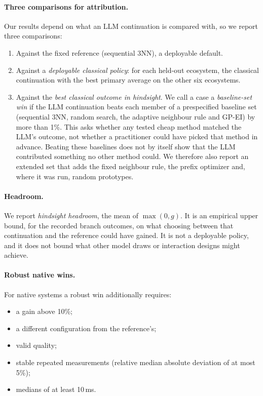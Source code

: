 \paragraph{Three comparisons for attribution.} Our results depend on what an LLM continuation is compared with, so we report three comparisons:
\begin{enumerate}
  \item Against the fixed reference (sequential 3NN), a deployable default.
  \item Against a \emph{deployable classical policy}: for each held-out ecosystem, the classical continuation with the best primary average on the other six ecosystems.
  \item Against the \emph{best classical outcome in hindsight}. We call a case a \emph{baseline-set win} if the LLM continuation beats each member of a prespecified baseline set (sequential 3NN, random search, the adaptive neighbour rule and GP-EI) by more than 1\%. This asks whether any tested cheap method matched the LLM's outcome, not whether a practitioner could have picked that method in advance. Beating these baselines does not by itself show that the LLM contributed something no other method could. We therefore also report an extended set that adds the fixed neighbour rule, the prefix optimizer and, where it was run, random prototypes.
\end{enumerate}

\paragraph{Headroom.} We report \emph{hindsight headroom}, the mean of $\max(0, g)$. It is an empirical upper bound, for the recorded branch outcomes, on what choosing between that continuation and the reference could have gained. It is not a deployable policy, and it does not bound what other model draws or interaction designs might achieve.

\paragraph{Robust native wins.} For native systems a robust win additionally requires:
\begin{itemize}
  \item a gain above 10\%;
  \item a different configuration from the reference's;
  \item valid quality;
  \item stable repeated measurements (relative median absolute deviation of at most 5\%);
  \item medians of at least 10\,ms.
\end{itemize}

